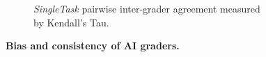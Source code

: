 \begin{figure}[h]
\begin{subfigure}[b]{0.49\textwidth}
    \caption{\footnotesize \emph{SingleTask} pairwise inter-grader agreement measured by Kendall’s Tau.}
    \label{fig:sub4}
  \end{subfigure}
  \caption{\textbf{Bias and consistency of AI graders.} }
  \label{fig:grader_consistency}
\end{figure}
